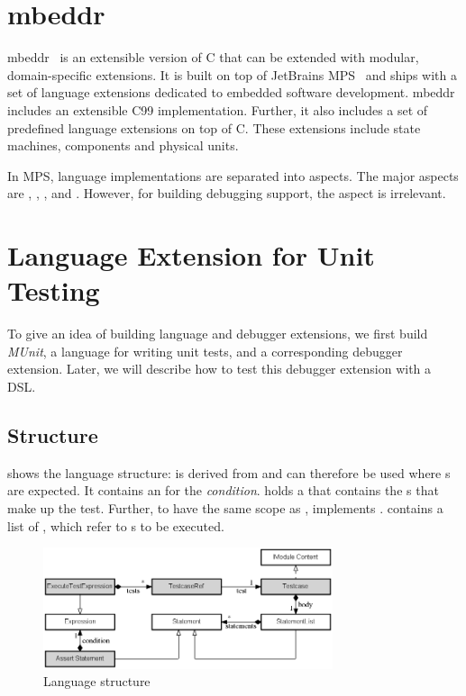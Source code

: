 \vspace{-1mm}
\section{mbeddr}

mbeddr~\cite{Voelter:2012:MEC:2384716.2384767} is an extensible version of C
that can be extended with modular, domain-specific extensions. 
It is built on top of JetBrains \ac{MPS}~\cite{2012_mps_homepage}
and ships with a set of language extensions dedicated to embedded software
development. mbeddr includes an extensible C99 implementation. Further, 
it also includes a set of predefined language extensions on top of C. These 
extensions include state machines, components and physical units.

In \ac{MPS}, language implementations are separated into aspects. 
The major aspects  are , 
, ,  and . However, for
building debugging support, the  aspect is irrelevant.

\section{Language Extension for Unit Testing}

To give an idea of building language and debugger extensions, we first 
build \emph{MUnit}, a language for writing 
unit tests, and a corresponding debugger extension. Later,
we will describe how to test this debugger extension with a \ac{DSL}. 

\subsection{Structure}

 shows the language structure:
 is derived from  and can therefore
be used where s are expected. It contains an 
for the \emph{condition}.
 holds a  that contains the s
that make up the test. Further, to have the same scope as ,
 implements .
 contains a list of
, which refer to s to be executed.

\begin{figure}[h]
  \vspace{-4mm}
  \centering
    \includegraphics[width=8.5cm]{./figures/graph-1.png} 
    \vspace{-5mm} 
    \caption{Language structure}
  \label{fig:UnitTestStructure}
  \vspace{-5mm}
\end{figure}

